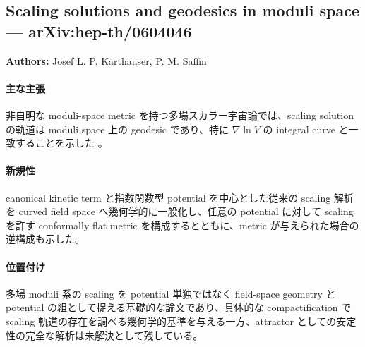 \subsection{Scaling solutions and geodesics in moduli space --- arXiv:hep-th/0604046}

\textbf{Authors:} Josef L. P. Karthauser, P. M. Saffin

\paragraph{主な主張}
非自明な moduli-space metric を持つ多場スカラー宇宙論では、scaling solution の軌道は moduli space 上の geodesic であり、特に $\nabla \ln V$ の integral curve と一致することを示した \cite{Karthauser:2006scaling}。

\paragraph{新規性}
canonical kinetic term と指数関数型 potential を中心とした従来の scaling 解析を curved field space へ幾何学的に一般化し、任意の potential に対して scaling を許す conformally flat metric を構成するとともに、metric が与えられた場合の逆構成も示した。

\paragraph{位置付け}
多場 moduli 系の scaling を potential 単独ではなく field-space geometry と potential の組として捉える基礎的な論文であり、具体的な compactification で scaling 軌道の存在を調べる幾何学的基準を与える一方、attractor としての安定性の完全な解析は未解決として残している。
